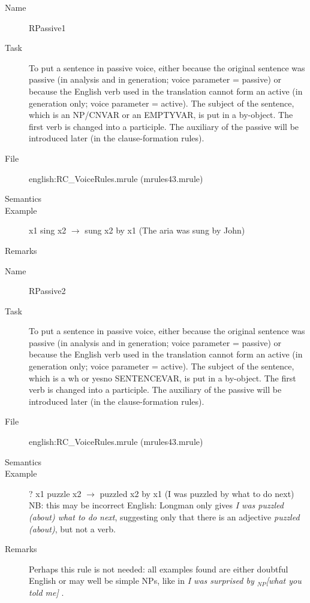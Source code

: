 \begin{description}
\vspace{1 cm}
\begin{description}
\item[Name] RPassive1
\item[Task] To put a sentence in passive voice, either because the original 
sentence was passive (in analysis and in generation; voice parameter = passive)
or because the English verb used in the translation cannot form an active
(in generation only; voice parameter = active). The subject of the sentence, 
which is an NP/CNVAR or an EMPTYVAR, is put in a by-object. The first verb is 
changed into a participle. The auxiliary of the passive will be introduced 
later (in the clause-formation rules).
\item[File] english:RC\_VoiceRules.mrule (mrules43.mrule)
\item[Semantics]
\item[Example] x1 sing x2 $\rightarrow$ sung x2 by x1 (The aria was sung by John)
\item[Remarks]
\end{description}

\vspace{1 cm}
\begin{description}
\item[Name] RPassive2
\item[Task] To put a sentence in passive voice, either because the original 
sentence was passive (in analysis and in generation; voice parameter = passive)
or because the English verb used in the translation cannot form an active
(in generation only; voice parameter = active). The subject of the sentence, 
which is a wh or yesno SENTENCEVAR, is put in a by-object. The first verb is 
changed into a participle. The auxiliary of the passive will be introduced 
later (in the clause-formation rules).
\item[File] english:RC\_VoiceRules.mrule (mrules43.mrule)
\item[Semantics]
\item[Example] ? x1 puzzle x2 $\rightarrow$ puzzled x2 by x1 (I was 
puzzled by what to do next)\\
NB: this may be incorrect English: Longman only gives {\em I 
was puzzled (about) what to do next\/}, suggesting only that there is an 
adjective {\em puzzled (about)\/}, but not a verb.
\item[Remarks] Perhaps this rule is not needed: all examples found are either 
doubtful English or may well be simple NPs, like in {\em I was surprised by 
$_{NP}$[what you told me] \/}.
\end{description}


\end{description}

